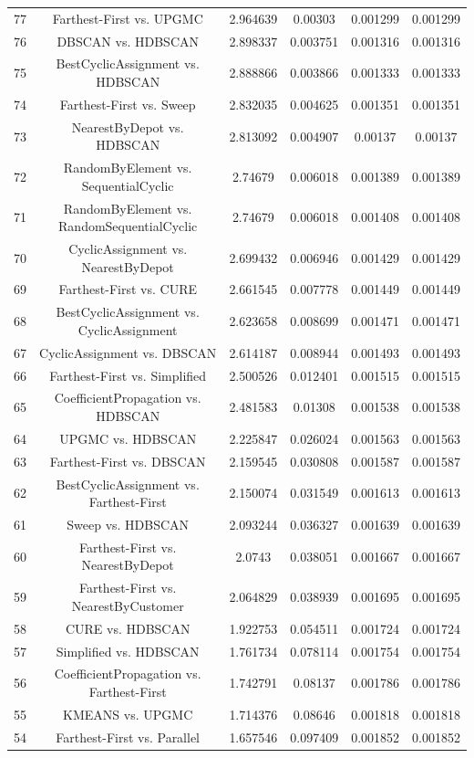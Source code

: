 \documentclass[a4paper,10pt]{article}
\begin{document}
\begin{landscape}
\begin{table}[!htp]
\begin{tabular}{cccccc}
77&Farthest-First vs. UPGMC&2.964639&0.00303&0.001299&0.001299\\
76&DBSCAN vs. HDBSCAN&2.898337&0.003751&0.001316&0.001316\\
75&BestCyclicAssignment vs. HDBSCAN&2.888866&0.003866&0.001333&0.001333\\
74&Farthest-First vs. Sweep&2.832035&0.004625&0.001351&0.001351\\
73&NearestByDepot vs. HDBSCAN&2.813092&0.004907&0.00137&0.00137\\
72&RandomByElement vs. SequentialCyclic&2.74679&0.006018&0.001389&0.001389\\
71&RandomByElement vs. RandomSequentialCyclic&2.74679&0.006018&0.001408&0.001408\\
70&CyclicAssignment vs. NearestByDepot&2.699432&0.006946&0.001429&0.001429\\
69&Farthest-First vs. CURE&2.661545&0.007778&0.001449&0.001449\\
68&BestCyclicAssignment vs. CyclicAssignment&2.623658&0.008699&0.001471&0.001471\\
67&CyclicAssignment vs. DBSCAN&2.614187&0.008944&0.001493&0.001493\\
66&Farthest-First vs. Simplified&2.500526&0.012401&0.001515&0.001515\\
65&CoefficientPropagation vs. HDBSCAN&2.481583&0.01308&0.001538&0.001538\\
64&UPGMC vs. HDBSCAN&2.225847&0.026024&0.001563&0.001563\\
63&Farthest-First vs. DBSCAN&2.159545&0.030808&0.001587&0.001587\\
62&BestCyclicAssignment vs. Farthest-First&2.150074&0.031549&0.001613&0.001613\\
61&Sweep vs. HDBSCAN&2.093244&0.036327&0.001639&0.001639\\
60&Farthest-First vs. NearestByDepot&2.0743&0.038051&0.001667&0.001667\\
59&Farthest-First vs. NearestByCustomer&2.064829&0.038939&0.001695&0.001695\\
58&CURE vs. HDBSCAN&1.922753&0.054511&0.001724&0.001724\\
57&Simplified vs. HDBSCAN&1.761734&0.078114&0.001754&0.001754\\
56&CoefficientPropagation vs. Farthest-First&1.742791&0.08137&0.001786&0.001786\\
55&KMEANS vs. UPGMC&1.714376&0.08646&0.001818&0.001818\\
54&Farthest-First vs. Parallel&1.657546&0.097409&0.001852&0.001852\\

\end{tabular}
\end{table}
\end{landscape}
\end{document}
